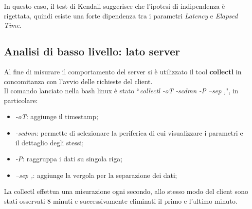 In questo caso, il test di Kendall suggerisce che l'ipotesi di indipendenza è
rigettata, quindi esiste una forte dipendenza tra i parametri \textit{Latency} e
\textit{Elapsed Time}.

\subsection{Analisi di basso livello: lato server}
Al fine di misurare il comportamento del server si è utilizzato il tool \textbf{collectl}
in concomitanza con l'avvio delle richieste del client.\\
Il comando lanciato nella bash linux è stato
``\textit{collectl -oT -scdmn -P --sep ,}", in particolare:

\begin{itemize}
  \item \textit{-oT}: aggiunge il timestamp;
  \item \textit{-scdmn}:  permette di selezionare la periferica di cui visualizzare
  i parametri e il dettaglio degli stessi;
  \item \textit{-P}: raggruppa i dati su singola riga;
  \item \textit{--sep ,}: aggiunge la vergola per la separazione dei dati;
\end{itemize}

La collectl effettua una misurazione ogni secondo, allo stesso modo del client sono
stati osservati 8 minuti e successivamente eliminati il primo e l'ultimo minuto.\\

